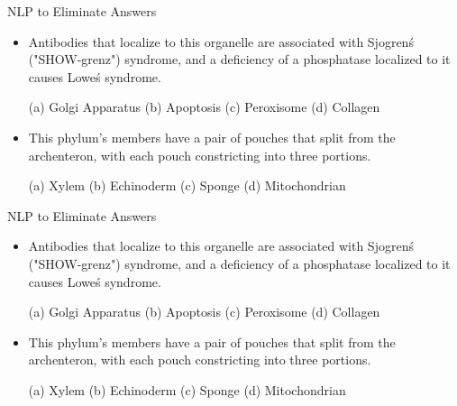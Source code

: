 \documentclass{beamer}
\begin{document}

\begin{frame}{NLP to Eliminate Answers}
   \begin{itemize}
      \item Antibodies that localize to this organelle are associated with Sjogren\'s ("SHOW-grenz") syndrome, and a deficiency of a phosphatase localized to it causes Lowe\'s syndrome.

	(a) Golgi Apparatus (b) Apoptosis (c) Peroxisome (d) Collagen

      \item This phylum's members have a pair of pouches that split from the archenteron, with each pouch constricting into three portions. 

	(a) Xylem (b) Echinoderm (c) Sponge (d) Mitochondrian
   \end{itemize}
\end{frame}


\begin{frame}{NLP to Eliminate Answers}
   \begin{itemize}
      \item Antibodies that localize to {\color{red}this} {\color{green}organelle} are associated with Sjogren\'s ("SHOW-grenz") syndrome, and a deficiency of a phosphatase localized to it causes Lowe\'s syndrome.

	(a) {\color{green}Golgi Apparatus} (b) Apoptosis (c) {\color{green}Peroxisome} (d) Collagen

      \item {\color{red}This} {\color{green}phylum's} members have a pair of pouches that split from the archenteron, with each pouch constricting into three portions. 

	(a) Xylem (b) {\color{green}Echinoderm} (c) Sponge (d) Mitochondrian
   \end{itemize}
\end{frame}
\end{document}
